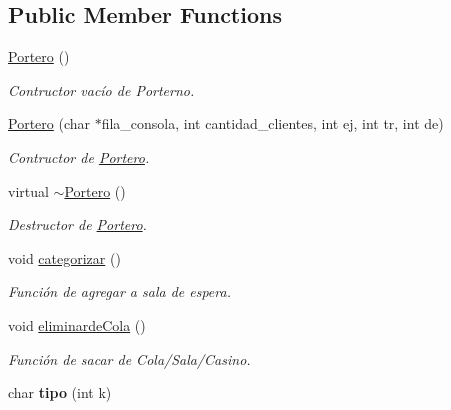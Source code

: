 \subsection*{Public Member Functions}
\begin{DoxyCompactItemize}
\item 
\hypertarget{class_portero_a7d760bc2477fe16dbb23c433a6aca4b2}{\hyperlink{class_portero_a7d760bc2477fe16dbb23c433a6aca4b2}{Portero} ()}\label{class_portero_a7d760bc2477fe16dbb23c433a6aca4b2}

\begin{DoxyCompactList}\small\item\em Contructor vacío de Porterno. \end{DoxyCompactList}\item 
\hypertarget{class_portero_a5534b8e4da1f89e0c84accd77afec404}{\hyperlink{class_portero_a5534b8e4da1f89e0c84accd77afec404}{Portero} (char $\ast$fila\+\_\+consola, int cantidad\+\_\+clientes, int ej, int tr, int de)}\label{class_portero_a5534b8e4da1f89e0c84accd77afec404}

\begin{DoxyCompactList}\small\item\em Contructor de \hyperlink{class_portero}{Portero}. \end{DoxyCompactList}\item 
\hypertarget{class_portero_a62e60c59b6211299f40e3cff5ba89ab2}{virtual \hyperlink{class_portero_a62e60c59b6211299f40e3cff5ba89ab2}{$\sim$\+Portero} ()}\label{class_portero_a62e60c59b6211299f40e3cff5ba89ab2}

\begin{DoxyCompactList}\small\item\em Destructor de \hyperlink{class_portero}{Portero}. \end{DoxyCompactList}\item 
\hypertarget{class_portero_a9887c6b1b6d710188e4c8d00bbd87282}{void \hyperlink{class_portero_a9887c6b1b6d710188e4c8d00bbd87282}{categorizar} ()}\label{class_portero_a9887c6b1b6d710188e4c8d00bbd87282}

\begin{DoxyCompactList}\small\item\em Función de agregar a sala de espera. \end{DoxyCompactList}\item 
\hypertarget{class_portero_ae4c80a71fc3f5aa0f2951770e5f68d0d}{void \hyperlink{class_portero_ae4c80a71fc3f5aa0f2951770e5f68d0d}{eliminarde\+Cola} ()}\label{class_portero_ae4c80a71fc3f5aa0f2951770e5f68d0d}

\begin{DoxyCompactList}\small\item\em Función de sacar de Cola/\+Sala/\+Casino. \end{DoxyCompactList}\item 
\hypertarget{class_portero_ac59d476839cdff7a231672a9b42b340f}{char {\bfseries tipo} (int k)}\label{class_portero_ac59d476839cdff7a231672a9b42b340f}

\end{DoxyCompactItemize}

